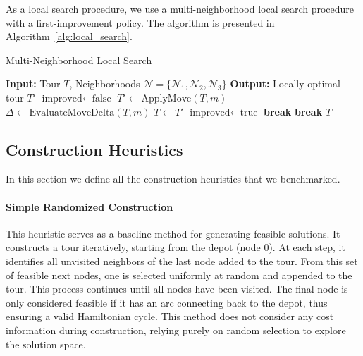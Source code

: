 \documentclass[twocolumn, switch]{article} %
\begin{document}
As a local search procedure, we use a multi-neighborhood local search procedure with a first-improvement policy.
The algorithm is presented in Algorithm~\ref{alg:local_search}.

\begin{algorithm}
\caption{Multi-Neighborhood Local Search}
\label{alg:local_search}
\begin{algorithmic}[1]
\State \textbf{Input:} Tour $T$, Neighborhoods $\mathcal{N} = \{\mathcal{N}_1, \mathcal{N}_2, \mathcal{N}_3\}$
\State \textbf{Output:} Locally optimal tour $T'$
\Repeat
    \State $\text{improved} \leftarrow \text{false}$
            \State $T' \leftarrow \text{ApplyMove}(T, m)$
            \State $\Delta \leftarrow \text{EvaluateMoveDelta}(T, m)$ 
                \State $T \leftarrow T'$
                \State $\text{improved} \leftarrow \text{true}$
                \State \textbf{break} 
            \EndIf
        \EndFor
            \State \textbf{break} 
        \EndIf
    \EndFor
{}
\State \Return $T$
\end{algorithmic}
\end{algorithm}

\subsection{Construction Heuristics}
In this section we define all the construction heuristics that we benchmarked. 

\paragraph{Simple Randomized Construction}
This heuristic serves as a baseline method for generating feasible solutions. It constructs a tour iteratively, starting from the depot (node 0). At each step, it identifies all unvisited neighbors of the last node added to the tour. From this set of feasible next nodes, one is selected uniformly at random and appended to the tour. This process continues until all nodes have been visited. The final node is only considered feasible if it has an arc connecting back to the depot, thus ensuring a valid Hamiltonian cycle. This method does not consider any cost information during construction, relying purely on random selection to explore the solution space.
\end{document}
